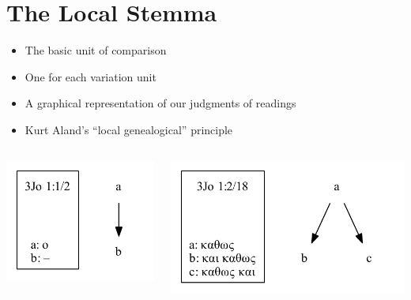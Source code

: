 \documentclass[10pt]{beamer}
\begin{document}
	\section*{The Local Stemma}
	\begin{frame}
		\begin{itemize}
			\item The basic unit of comparison
			\item One for each variation unit
			\item A graphical representation of our judgments of readings
			\item Kurt Aland's ``local genealogical'' principle
		\end{itemize}
		\begin{columns}
			\begin{column}{0.45\textwidth}
				\begin{center}
					\includegraphics[scale=0.5]{../img/B25K1V1U2-local-stemma.pdf}
				\end{center}
			\end{column}
			\begin{column}{0.45\textwidth}
				\begin{center}
					\includegraphics[scale=0.5]{../img/B25K1V2U18-local-stemma.pdf}
				\end{center}
			\end{column}
		\end{columns}
	\end{frame}
\end{document}
